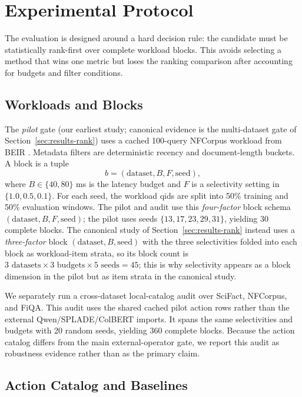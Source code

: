 \section{Experimental Protocol}
\label{sec:protocol}

The evaluation is designed around a hard decision rule: the candidate must be statistically rank-first over complete workload blocks. This avoids selecting a method that wins one metric but loses the ranking comparison after accounting for budgets and filter conditions.

\subsection{Workloads and Blocks}

The \emph{pilot} gate (our earliest study; canonical evidence is the multi-dataset gate of Section~\ref{sec:results-rank}) uses a cached 100-query NFCorpus workload from BEIR \cite{thakur2021beir}. Metadata filters are deterministic recency and document-length buckets. A block is a tuple
\begin{equation}
  b=(\mathrm{dataset},B,F,\mathrm{seed}),
\end{equation}
where $B\in\{40,80\}$ ms is the latency budget and $F$ is a selectivity setting in $\{1.0,0.5,0.1\}$. For each seed, the workload qids are split into 50\% training and 50\% evaluation windows. The pilot and audit use this \emph{four-factor} block schema $(\mathrm{dataset},B,F,\mathrm{seed})$; the pilot uses seeds $\{13,17,23,29,31\}$, yielding 30 complete blocks. The canonical study of Section~\ref{sec:results-rank} instead uses a \emph{three-factor} block $(\mathrm{dataset},B,\mathrm{seed})$ with the three selectivities folded into each block as workload-item strata, so its block count is $3\text{ datasets}\times3\text{ budgets}\times5\text{ seeds}=45$; this is why selectivity appears as a block dimension in the pilot but as item strata in the canonical study.

We separately run a cross-dataset local-catalog audit over SciFact, NFCorpus, and FiQA. This audit uses the shared cached pilot action rows rather than the external Qwen/SPLADE/ColBERT imports. It spans the same selectivities and budgets with 20 random seeds, yielding 360 complete blocks. Because the action catalog differs from the main external-operator gate, we report this audit as robustness evidence rather than as the primary claim.

\subsection{Action Catalog and Baselines}

